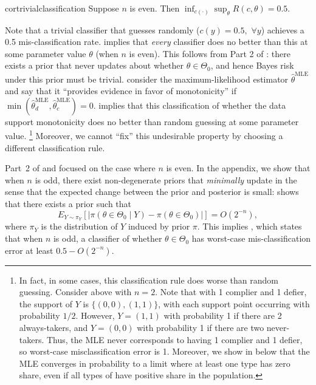 \documentclass[12pt,reqno]{amsart}
\theoremstyle{theorem}
\theoremstyle{definition}
\newcommand{\0}{\mathbf{0}}
\newcommand{\1}{\mathbf{1}}
\begin{document}
\begin{restatable}{cor}{trivialclassification}
 \label{cor:trivialclassification}
Suppose $n$ is even. Then $\inf_{c(\cdot)} \sup_{\theta} R(c,\theta) = 0.5$.         
\end{restatable}

\noindent Note that a trivial classifier that guesses randomly ($c(y) = 0.5,$ $\forall y$) achieves a 0.5 mis-classification rate.  implies that \emph{every} classifier does no better than this at some parameter value $\theta$ (when $n$ is even). This follows from Part 2 of : there exists a prior that never updates about whether $\theta \in \Theta_0$, and hence Bayes risk under this prior must be trivial. \citet{christy_counting_2025} consider the maximum-likelihood estimator $\hat\theta^{\text{MLE}}$ and say that it ``provides evidence in favor of monotonicity'' if $\min(\hat\theta^{\text{MLE}}_d, \hat\theta^{\text{MLE}}_c) = 0$.  implies that this classification of whether the data support monotonicity does no better than random guessing at some parameter value.%
\footnote{In fact, in some cases, this classification rule does worse than random guessing. Consider  above with $n=2$. Note that with 1 complier and 1 defier, the support of $Y$ is $\{(0,0),(1,1)\}$, with each support point occurring with probability $1/2$. However, $Y=(1,1)$ with probability 1 if there are 2 always-takers, and $Y=(0,0)$ with probability 1 if there are two never-takers. Thus, the MLE never corresponds to having 1 complier and 1 defier, so worst-case misclassification error is 1. Moreover, we show in  below that the MLE converges in probability to a limit where at least one type has zero share, even if all types of have positive share in the population.}
Moreover, we cannot ``fix'' this undesirable property by choosing a different classification rule.

Part~2 of  and  focused on the
case where $n$ is even. In the appendix, we show that when $n$ is odd, there exist
non-degenerate priors that \emph{minimally} update in the sense that the expected change
between the prior and posterior is small:  shows that there
exists a prior such that \[ E_{Y \sim \pi_Y}[ | \pi(\theta \in \Theta_0 \mid Y) -
\pi(\theta \in \Theta_0) |] = O(2^{-n}), \] where $\pi_Y$ is the distribution of $Y$
induced by prior $\pi$. This implies , which states that when
$n$ is odd, a classifier of whether $\theta \in \Theta_0$ has worst-case
mis-classification error at least $0.5 - O(2^{-n})$.
\end{document}
